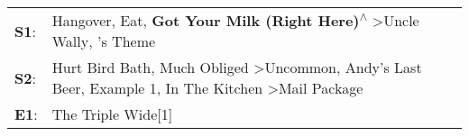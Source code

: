 \begin{supertabular}{p{0.03\textwidth}p{0.92\textwidth}}
 \textbf{S1}:  &                                                                                  Hangover\textsuperscript{}, \enspace Eat\textsuperscript{}, \enspace \textbf{Got Your Milk (Right Here)\textsuperscript{$\wedge$}} \textgreater \enspace Uncle Wally\textsuperscript{}, 's Theme\textsuperscript{}  \enspace  \\
 \textbf{S2}:  &  Hurt Bird Bath\textsuperscript{}, \enspace Much Obliged\textsuperscript{} \textgreater \enspace Uncommon\textsuperscript{}, \enspace Andy's Last Beer\textsuperscript{}, \enspace Example 1\textsuperscript{}, \enspace In The Kitchen\textsuperscript{} \textgreater \enspace Mail Package\textsuperscript{}  \enspace  \\
 \textbf{E1}:  &                                                                                                                                                                                                                                                                           The Triple Wide[1]\textsuperscript{}  \enspace  \\
\end{supertabular}
